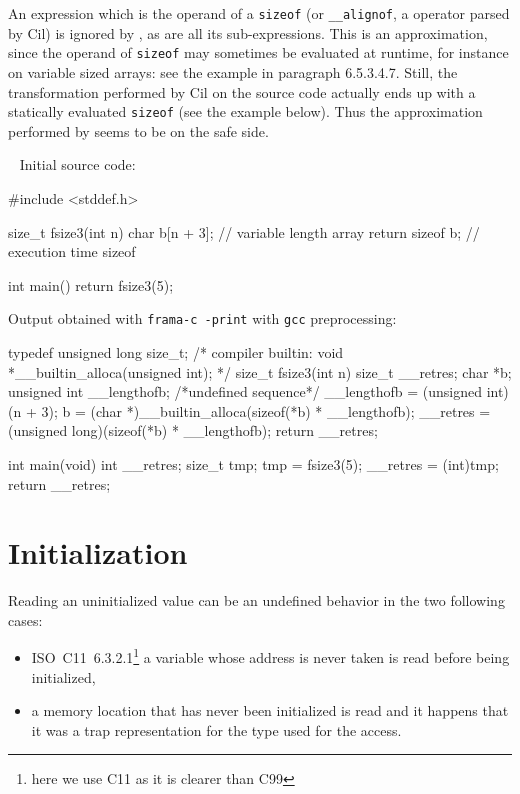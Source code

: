 An expression which is the operand of a \lstinline|sizeof| (or
\lstinline|__alignof|, a \gcc{} operator parsed by Cil) is ignored by \rte{}, as
are all its sub-expressions.  This is an approximation, since the operand of
\lstinline|sizeof| may sometimes be evaluated at runtime, for instance on
variable sized arrays: see the example in \cnn{} paragraph \mbox{6.5.3.4.7}.
Still, the transformation performed by Cil on the source code actually ends up
with a statically evaluated \lstinline|sizeof| (see the example below).  Thus
the approximation performed by \rte{} seems to be on the safe side.

\begin{example} ~
Initial source code:

\begin{listing-nonumber}
#include <stddef.h>

size_t fsize3(int n) {
  char b[n + 3]; // variable length array
  return sizeof b; // execution time sizeof
}

int main() {
  return fsize3(5);
}
\end{listing-nonumber}

Output obtained with \lstinline|frama-c -print| with \lstinline|gcc|
preprocessing:

\begin{listing-nonumber}
typedef unsigned long size_t;
/* compiler builtin:
   void *__builtin_alloca(unsigned int);   */
size_t fsize3(int n)
{
  size_t __retres;
  char *b;
  unsigned int __lengthofb;
  {
    /*undefined sequence*/
    __lengthofb = (unsigned int)(n + 3);
    b = (char *)__builtin_alloca(sizeof(*b) * __lengthofb);
  }
  __retres = (unsigned long)(sizeof(*b) * __lengthofb);
  return __retres;
}

int main(void)
{
  int __retres;
  size_t tmp;
  tmp = fsize3(5);
  __retres = (int)tmp;
  return __retres;
}
\end{listing-nonumber}

\end{example}

\section{Initialization}

Reading an uninitialized value can be an undefined behavior in the two following
cases:

\begin{itemize}
\item \mbox{ISO C11 6.3.2.1}\footnote{here we use C11 as it is clearer than C99}
      a variable whose address is never taken is read before being initialized,
\item a memory location that has never been initialized is read and it happens
      that it was a trap representation for the type used for the access.
\end{itemize}

